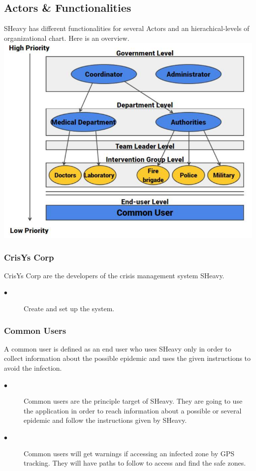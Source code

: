 \subsection{Actors \& Functionalities}
SHeavy has different functionalities for several Actors and  an
hierachical-levels of organizational chart. Here is an overview.\\

\includegraphics{images/ActorLevels.PNG} \\

\subsubsection{CrisYs Corp}
CrisYs Corp are the developers of the crisis management system SHeavy.\\
\begin{description}
 \item[$\bullet$] Create and set up the system.
\end{description} 

\subsubsection{Common Users}
A common user is defined as an end user who uses SHeavy only in order to
collect information about the possible epidemic and uses the given instructions
to avoid the infection.\\
\begin{description}
 \item[$\bullet$] Common users are the principle target of SHeavy. They are
 going to use the application in order to reach information about a possible
 or several epidemic and follow the instructions given by SHeavy. 
 \item[$\bullet$]Common users will get warnings if accessing an infected
zone by GPS tracking. They will have paths to follow to access and find the
safe zones.
\end{description}

